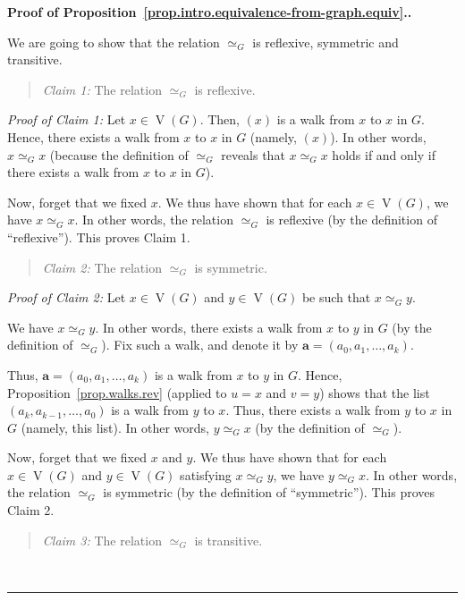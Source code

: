 \documentclass[numbers=enddot,12pt,final,onecolumn,notitlepage]{scrartcl}%
\theoremstyle{definition}
\newenvironment{statement}{\begin{quote}}{\end{quote}}
\newenvironment{proof}[1][Proof]{\noindent\textbf{#1.} }{\ \rule{0.5em}{0.5em}}
\newcommand{\tup}[1]{\left( #1 \right)}
\newcommand{\verts}[1]{\operatorname{V}\left( #1 \right)}
\begin{document}
\begin{proof}[Proof of
Proposition~\ref{prop.intro.equivalence-from-graph.equiv}.]

We are going to show that the relation $\simeq_G$ is reflexive,
symmetric and transitive.

\begin{statement}
\textit{Claim 1:} The relation $\simeq_G$ is reflexive.
\end{statement}

\textit{Proof of Claim 1:} Let
$x \in \verts{G}$. Then, $\tup{x}$ is a walk from $x$ to $x$ in $G$.
Hence, there exists a walk from $x$ to $x$ in $G$ (namely,
$\tup{x}$). In other words, $x \simeq_G x$ (because the definition of
$\simeq_G$ reveals that $x \simeq_G x$ holds if and only if there
exists a walk from $x$ to $x$ in $G$).

Now, forget that we fixed $x$. We thus have shown that for each
$x \in \verts{G}$, we have $x \simeq_G x$. In other words, the
relation $\simeq_G$ is reflexive (by the definition of ``reflexive'').
This proves Claim 1.

\begin{statement}
\textit{Claim 2:} The relation $\simeq_G$ is symmetric.
\end{statement}

\textit{Proof of Claim 2:} Let $x \in \verts{G}$ and $y \in \verts{G}$
be such that $x \simeq_G y$.

We have $x \simeq_G y$. In other words, there exists a walk from $x$
to $y$ in $G$ (by the definition of $\simeq_G$). Fix such a walk, and
denote it by $\mathbf{a} = \tup{a_0, a_1, \ldots, a_k}$.

Thus, $\mathbf{a} = \tup{a_0, a_1, \ldots, a_k}$ is a walk from $x$
to $y$ in $G$. Hence, Proposition~\ref{prop.walks.rev} (applied to
$u = x$ and $v = y$) shows that the list
$\tup{a_k, a_{k-1}, \ldots, a_0}$ is a walk from $y$ to $x$. Thus,
there exists a walk from $y$ to $x$ in $G$ (namely, this list). In
other words, $y \simeq_G x$ (by the definition of $\simeq_G$).

Now, forget that we fixed $x$ and $y$. We thus have shown that for
each $x \in \verts{G}$ and $y \in \verts{G}$ satisfying
$x \simeq_G y$, we have $y \simeq_G x$. In other words, the
relation $\simeq_G$ is symmetric (by the definition of ``symmetric'').
This proves Claim 2.

\begin{statement}
\textit{Claim 3:} The relation $\simeq_G$ is transitive.
\end{statement}


\end{proof}
\end{document}
